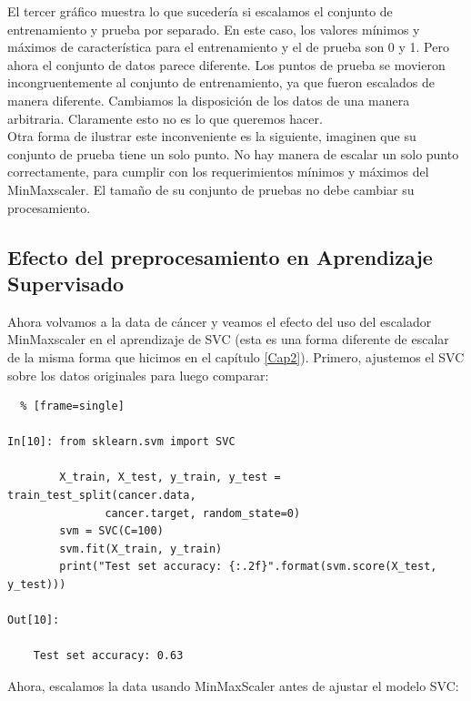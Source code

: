 El tercer  gráfico  muestra lo que sucedería si escalamos el conjunto de entrenamiento y prueba por separado. En este caso, los valores mínimos y máximos de característica para el entrenamiento y el de  prueba  son  0 y 1.   Pero ahora el conjunto de datos parece diferente. Los puntos de prueba se movieron incongruentemente al conjunto de entrenamiento, ya que fueron escalados de manera diferente. Cambiamos la disposición de los datos de una manera arbitraria.  Claramente esto no es lo que queremos hacer. \\

Otra forma de ilustrar este inconveniente es la siguiente, imaginen que su conjunto de prueba tiene un solo punto. No hay manera de escalar un solo punto correctamente, para cumplir con los requerimientos mínimos y máximos del {\ttfamily MinMaxscaler}. El tamaño de su conjunto de pruebas no debe cambiar su procesamiento.\\






\subsection{Efecto del preprocesamiento en Aprendizaje \\ Supervisado}


Ahora volvamos a la data de cáncer y veamos el efecto del uso del escalador  {\ttfamily MinMaxscaler} en el aprendizaje de  SVC (esta es una forma diferente de escalar de la misma forma que hicimos en el capítulo \ref{Cap2}). Primero, ajustemos el SVC sobre  los datos originales para luego comparar:


\begin{lstlisting}  % [frame=single]	

In[10]: from sklearn.svm import SVC
   
        X_train, X_test, y_train, y_test = train_test_split(cancer.data, 
               cancer.target, random_state=0)
        svm = SVC(C=100)
        svm.fit(X_train, y_train)
        print("Test set accuracy: {:.2f}".format(svm.score(X_test, y_test)))

Out[10]:

    Test set accuracy: 0.63

\end{lstlisting} 


Ahora, escalamos la data usando {\ttfamily MinMaxScaler} antes de ajustar el modelo SVC:


